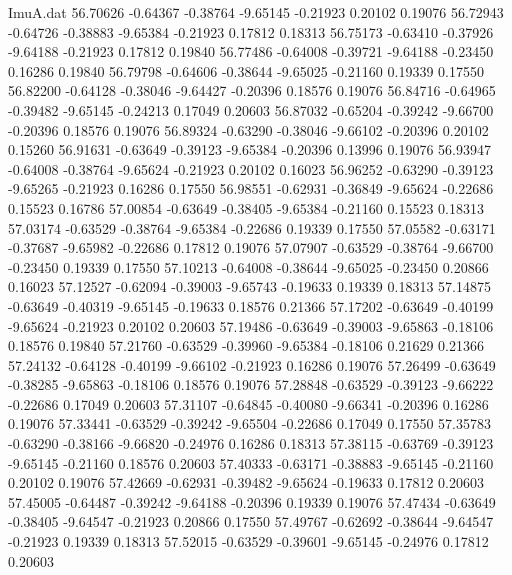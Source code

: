 \begin{filecontents}{ImuA.dat}
  56.70626   -0.64367   -0.38764   -9.65145   -0.21923    0.20102    0.19076
  56.72943   -0.64726   -0.38883   -9.65384   -0.21923    0.17812    0.18313
  56.75173   -0.63410   -0.37926   -9.64188   -0.21923    0.17812    0.19840
  56.77486   -0.64008   -0.39721   -9.64188   -0.23450    0.16286    0.19840
  56.79798   -0.64606   -0.38644   -9.65025   -0.21160    0.19339    0.17550
  56.82200   -0.64128   -0.38046   -9.64427   -0.20396    0.18576    0.19076
  56.84716   -0.64965   -0.39482   -9.65145   -0.24213    0.17049    0.20603
  56.87032   -0.65204   -0.39242   -9.66700   -0.20396    0.18576    0.19076
  56.89324   -0.63290   -0.38046   -9.66102   -0.20396    0.20102    0.15260
  56.91631   -0.63649   -0.39123   -9.65384   -0.20396    0.13996    0.19076
  56.93947   -0.64008   -0.38764   -9.65624   -0.21923    0.20102    0.16023
  56.96252   -0.63290   -0.39123   -9.65265   -0.21923    0.16286    0.17550
  56.98551   -0.62931   -0.36849   -9.65624   -0.22686    0.15523    0.16786
  57.00854   -0.63649   -0.38405   -9.65384   -0.21160    0.15523    0.18313
  57.03174   -0.63529   -0.38764   -9.65384   -0.22686    0.19339    0.17550
  57.05582   -0.63171   -0.37687   -9.65982   -0.22686    0.17812    0.19076
  57.07907   -0.63529   -0.38764   -9.66700   -0.23450    0.19339    0.17550
  57.10213   -0.64008   -0.38644   -9.65025   -0.23450    0.20866    0.16023
  57.12527   -0.62094   -0.39003   -9.65743   -0.19633    0.19339    0.18313
  57.14875   -0.63649   -0.40319   -9.65145   -0.19633    0.18576    0.21366
  57.17202   -0.63649   -0.40199   -9.65624   -0.21923    0.20102    0.20603
  57.19486   -0.63649   -0.39003   -9.65863   -0.18106    0.18576    0.19840
  57.21760   -0.63529   -0.39960   -9.65384   -0.18106    0.21629    0.21366
  57.24132   -0.64128   -0.40199   -9.66102   -0.21923    0.16286    0.19076
  57.26499   -0.63649   -0.38285   -9.65863   -0.18106    0.18576    0.19076
  57.28848   -0.63529   -0.39123   -9.66222   -0.22686    0.17049    0.20603
  57.31107   -0.64845   -0.40080   -9.66341   -0.20396    0.16286    0.19076
  57.33441   -0.63529   -0.39242   -9.65504   -0.22686    0.17049    0.17550
  57.35783   -0.63290   -0.38166   -9.66820   -0.24976    0.16286    0.18313
  57.38115   -0.63769   -0.39123   -9.65145   -0.21160    0.18576    0.20603
  57.40333   -0.63171   -0.38883   -9.65145   -0.21160    0.20102    0.19076
  57.42669   -0.62931   -0.39482   -9.65624   -0.19633    0.17812    0.20603
  57.45005   -0.64487   -0.39242   -9.64188   -0.20396    0.19339    0.19076
  57.47434   -0.63649   -0.38405   -9.64547   -0.21923    0.20866    0.17550
  57.49767   -0.62692   -0.38644   -9.64547   -0.21923    0.19339    0.18313
  57.52015   -0.63529   -0.39601   -9.65145   -0.24976    0.17812    0.20603
\end{filecontents}
